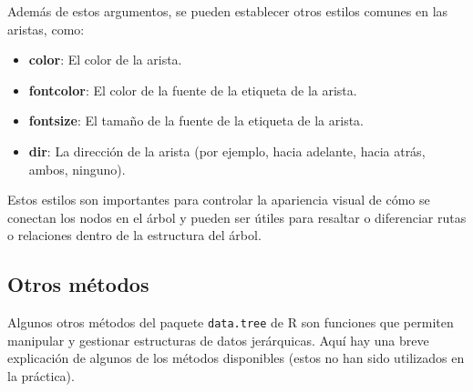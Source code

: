 \documentclass[12pt]{report}\usepackage[]{graphicx}\usepackage[dvipsnames]{xcolor}
\begin{document}
 	Además de estos argumentos, se pueden establecer otros estilos comunes en las aristas, como:
 	
 	\begin{itemize}
 		\item \textbf{color}: El color de la arista.
 		\item \textbf{fontcolor}: El color de la fuente de la etiqueta de la arista.
 		\item \textbf{fontsize}: El tamaño de la fuente de la etiqueta de la arista.
 		\item \textbf{dir}: La dirección de la arista (por ejemplo, hacia adelante, hacia atrás, ambos, ninguno).
 	\end{itemize}
 	
 	Estos estilos son importantes para controlar la apariencia visual de cómo se conectan los nodos en el árbol y pueden ser útiles para resaltar o diferenciar rutas o relaciones dentro de la estructura del árbol.
 	
 	\subsection{Otros métodos}
 	
 	Algunos otros métodos del paquete \texttt{data.tree} de R son funciones que permiten manipular y gestionar estructuras de datos jerárquicas. Aquí hay una breve explicación de algunos de los métodos disponibles (estos no han sido utilizados en la práctica).
 	
\end{document}
